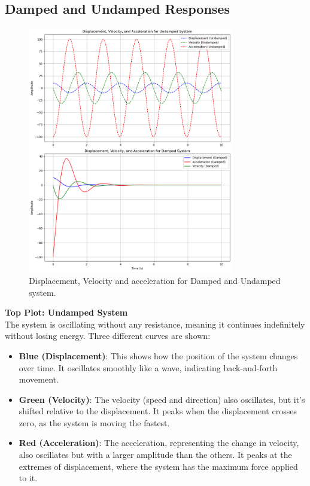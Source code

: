 \documentclass[12pt,a4paper]{article}
\begin{document}
\subsection{Damped and Undamped Responses}
\begin{figure}[H]
    \centering
    \includegraphics[width=0.8\textwidth]{disp_vel_acc_damp_and_undamp.png} 
    \caption{Displacement, Velocity and acceleration for Damped and Undamped system.}
    \label{fig:system}
\end{figure}
{\vspace{10pt}}
\noindent \textbf{Top Plot: Undamped System}\\
The system is oscillating without any resistance, meaning it continues indefinitely without losing energy. Three different curves are shown:

\begin{itemize}
    \item \textbf{Blue (Displacement)}: This shows how the position of the system changes over time. It oscillates smoothly like a wave, indicating back-and-forth movement.
    \item \textbf{Green (Velocity)}: The velocity (speed and direction) also oscillates, but it's shifted relative to the displacement. It peaks when the displacement crosses zero, as the system is moving the fastest.
    \item \textbf{Red (Acceleration)}: The acceleration, representing the change in velocity, also oscillates but with a larger amplitude than the others. It peaks at the extremes of displacement, where the system has the maximum force applied to it.
\end{itemize}
\end{document}
